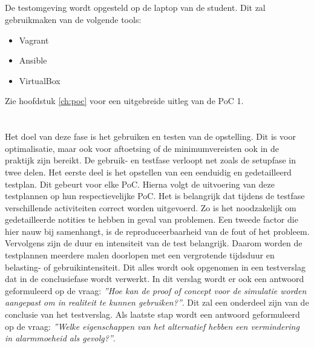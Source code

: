\subsection{}%
\label{sec:poc1}%
De testomgeving wordt opgesteld op de laptop van de student. Dit zal gebruikmaken van de volgende tools:

\begin{itemize}
    \item Vagrant
    \item Ansible
    \item VirtualBox
\end{itemize}

Zie hoofdstuk \ref{ch:poc} voor een uitgebreide uitleg van de PoC 1.



\section{}
\label{sec:use}
Het doel van deze fase is het gebruiken en testen van de opstelling. Dit is voor optimalisatie, maar ook voor aftoetsing of de minimumvereisten ook in de praktijk zijn bereikt. De gebruik- en testfase verloopt net zoals de setupfase in twee delen. Het eerste deel is het opstellen van een eenduidig en gedetailleerd testplan. Dit gebeurt voor elke PoC. Hierna volgt de uitvoering van deze testplannen op hun respectievelijke PoC. Het is belangrijk dat tijdens de testfase verschillende activiteiten correct worden uitgevoerd. Zo is het noodzakelijk om gedetailleerde notities te hebben in geval van problemen. Een tweede factor die hier nauw bij samenhangt, is de reproduceerbaarheid van de fout of het probleem. Vervolgens zijn de duur en intensiteit van de test belangrijk. Daarom worden de testplannen meerdere malen doorlopen met een vergrotende tijdsduur en belasting- of gebruikintensiteit. Dit alles wordt ook opgenomen in een testverslag dat in de conclusiefase wordt verwerkt. In dit verslag wordt er ook een antwoord geformuleerd op de vraag: \textit{''Hoe kan de proof of concept voor de simulatie worden aangepast om in realiteit te kunnen gebruiken?''}. Dit zal een onderdeel zijn van de conclusie van het testverslag. Als laatste stap wordt een antwoord geformuleerd op de vraag: \textit{''Welke eigenschappen van het alternatief hebben een vermindering in alarmmoeheid als gevolg?''}.

